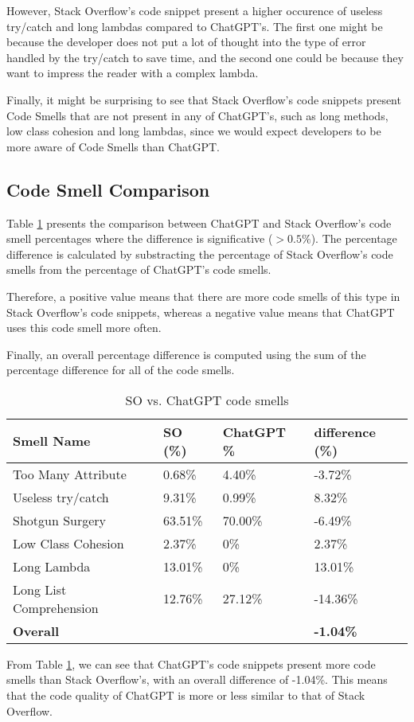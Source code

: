 However, Stack Overflow's code snippet present a higher occurence of useless try/catch and long lambdas compared to ChatGPT's. The first one might be because the developer does not put a lot of thought into the type of error handled by the try/catch to save time, and the second one could be because they want to impress the reader with a complex lambda.

Finally, it might be surprising to see that Stack Overflow's code snippets present Code Smells that are not present in any of ChatGPT's, such as long methods, low class cohesion and long lambdas, since we would expect developers to be more aware of Code Smells than ChatGPT.

\subsection{Code Smell Comparison}
\label{sec:results-comparison}

Table \ref{table:result-comparison} presents the comparison between ChatGPT and Stack Overflow's code smell percentages where the difference is significative ($>0.5\%$). The percentage difference is calculated by substracting the percentage of Stack Overflow's code smells from the percentage of ChatGPT's code smells.

Therefore, a positive value means that there are more code smells of this type in Stack Overflow's code snippets, whereas a negative value means that ChatGPT uses this code smell more often.

Finally, an overall percentage difference is computed using the sum of the percentage difference for all of the code smells.

\begin{table}[!ht]
    \centering
    \caption{SO vs. ChatGPT code smells}
    \begin{tabular}{llll}
        \hline
        \textbf{Smell Name}     & \textbf{SO (\%)} & \textbf{ChatGPT \%} & \textbf{ difference (\%) } \\ \hline
        Too Many Attribute      & 0.68\%           & 4.40\%              & -3.72\%                    \\
        Useless try/catch       & 9.31\%           & 0.99\%              & 8.32\%                     \\
        Shotgun Surgery         & 63.51\%          & 70.00\%             & -6.49\%                    \\
        Low Class Cohesion      & 2.37\%           & 0\%                 & 2.37\%                     \\
        Long Lambda             & 13.01\%          & 0\%                 & 13.01\%                    \\
        Long List Comprehension & 12.76\%          & 27.12\%             & -14.36\%                   \\
        \textbf{Overall}        &                  & ~                   & \textbf{-1.04\%}           \\ \hline
    \end{tabular}
    \label{table:result-comparison}
\end{table}

From Table \ref{table:result-comparison}, we can see that ChatGPT's code snippets present more code smells than Stack Overflow's, with an overall difference of -1.04\%. This means that the code quality of ChatGPT is more or less similar to that of Stack Overflow.
